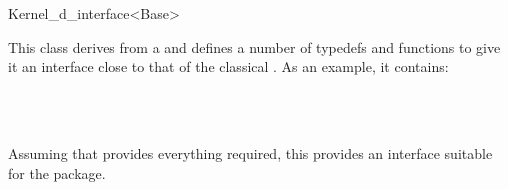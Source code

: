 \begin{ccRefClass}{Kernel_d_interface<Base>}

\ccDefinition
This class derives from a   and defines a number
of typedefs and functions to give it an interface close to that of the
classical . As an example, it contains:

\\
\\

Assuming that  provides everything required, this provides
an interface suitable for the  package.

\ccIsModel
{}

\end{ccRefClass}
